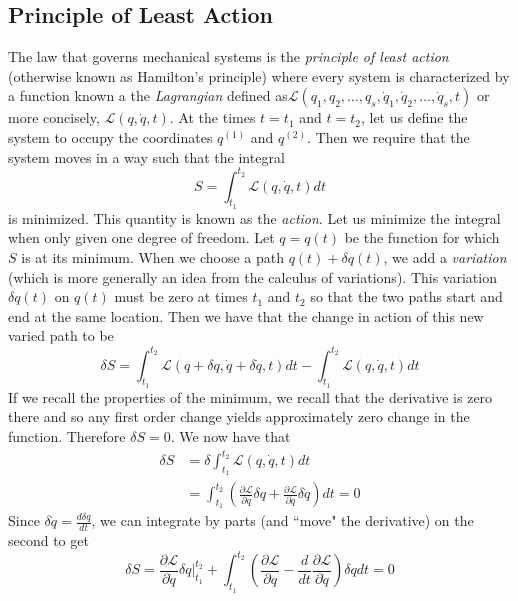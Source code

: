 \documentclass{article}
\newcommand{\pd}[2]{\frac{\partial #1}{\partial #2}}
\newcommand{\od}[2]{\frac{d #1}{d #2}}
\newcommand{\lagr}{\mathscr{L}}
\theoremstyle{definition}
\theoremstyle{remark}
\begin{document}
\subsection{Principle of Least Action}
The law that governs mechanical systems is the \emph{principle of least action} (otherwise known as Hamilton's principle) where every system is characterized by a function known a the \emph{Lagrangian} defined as$\lagr(q_1,q_2,\ldots, q_s,\dot q_1,\dot q_2, \ldots, \dot q_s,t)$ or more concisely, $\lagr(q,\dot q,t)$. At the times $t=t_1$ and $t=t_2$, let us define the system to occupy the coordinates $q^{(1)}$ and $q^{(2)}$. Then we require that the system moves in a way such that the integral 
\begin{equation}
    S=\int^{t_2}_{t_1} \lagr (q,\dot q,t)dt
\end{equation}
is minimized. This quantity is known as the \emph{action}. Let us minimize the integral when only given one degree of freedom. Let $q=q(t)$ be the function for which $S$ is at its minimum. When we choose a path $q(t)+\delta q(t)$, we add a \emph{variation} (which is more generally an idea from the calculus of variations). This variation $\delta q(t)$ on $q(t)$ must be zero at times $t_1$ and $t_2$ so that the two paths start and end at the same location. Then we have that the change in action of this new varied path to be 
\begin{equation*}
    \delta S =\int^{t_2}_{t_1}\lagr (q+ \delta q, \dot q+\delta \dot q, t)dt - \int^{t_2}_{t_1} \lagr (q,\dot q,t)dt
\end{equation*}
If we recall the properties of the minimum, we recall that the derivative is zero there and so any first order change yields approximately zero change in the function. Therefore $\delta S =0$. We now have that 
\begin{equation*}
    \begin{split}
        \delta S &= \delta \int^{t_2}_{t_1} \lagr (q,\dot q,t)dt \\
        &= \int^{t_2}_{t_1} \left( \pd{\lagr}{q} \delta q + \pd{\lagr}{\dot q} \delta \dot q \right) dt = 0
    \end{split}
\end{equation*}
Since $\delta \dot q = \od{ \delta q}{t}$, we can integrate by parts (and ``move" the derivative) on the second to get 
\begin{equation*}
    \delta S = \pd{\lagr}{\dot q} \delta q \Bigg|^{t_2}_{t_1} + \int^{t_2}_{t_1} \left( \pd{\lagr}{q} - \od{}{t} \pd{\lagr }{\dot q} \right) \delta q dt = 0
\end{equation*}
\end{document}
